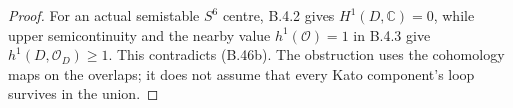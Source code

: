 \begin{proof}
For an actual semistable $S^6$ centre, B.4.2 gives
$H^1(D,\mathbb C)=0$, while upper semicontinuity
and the nearby value $h^1(\mathcal O)=1$ in B.4.3
give $h^1(D,\mathcal O_D)\geq1$. This contradicts
(B.46b). The obstruction uses the cohomology maps
on the overlaps; it does not assume that every
Kato component's loop survives in the union.
\end{proof}
